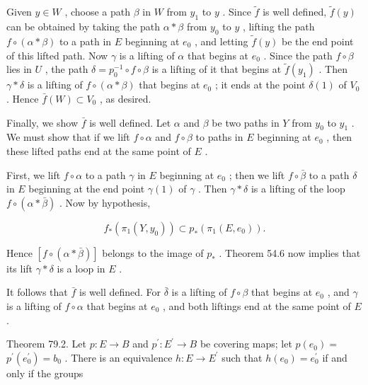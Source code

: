 Given \(y \in  W\) , choose a path \(\beta\) in \(W\) from \({y}_{1}\) to \(y\) . Since \(\widetilde{f}\) is well defined, \(\widetilde{f}\left( y\right)\) can be obtained by taking the path \(\alpha  * \beta\) from \({y}_{0}\) to \(y\) , lifting the path \(f \circ  \left( {\alpha  * \beta }\right)\) to a path in \(E\) beginning at \({e}_{0}\) , and letting \(\widetilde{f}\left( y\right)\) be the end point of this lifted path. Now \(\gamma\) is a lifting of \(\alpha\) that begins at \({e}_{0}\) . Since the path \(f \circ  \beta\) lies in \(U\) , the path \(\delta  = {p}_{0}^{-1} \circ  f \circ  \beta\) is a lifting of it that begins at \(\widetilde{f}\left( {y}_{1}\right)\) . Then \(\gamma  * \delta\) is a lifting of \(f \circ  \left( {\alpha  * \beta }\right)\) that begins at \({e}_{0}\) ; it ends at the point \(\delta \left( 1\right)\) of \({V}_{0}\) . Hence \(\bar{f}\left( W\right)  \subset  {V}_{0}\) , as desired.

Finally, we show \(\bar{f}\) is well defined. Let \(\alpha\) and \(\beta\) be two paths in \(Y\) from \({y}_{0}\) to \({y}_{1}\) . We must show that if we lift \(f \circ  \alpha\) and \(f \circ  \beta\) to paths in \(E\) beginning at \({e}_{0}\) , then these lifted paths end at the same point of \(E\) .

First, we lift \(f \circ  \alpha\) to a path \(\gamma\) in \(E\) beginning at \({e}_{0}\) ; then we lift \(f \circ  \bar{\beta }\) to a path \(\delta\) in \(E\) beginning at the end point \(\gamma \left( 1\right)\) of \(\gamma\) . Then \(\gamma  * \delta\) is a lifting of the loop \(f \circ  \left( {\alpha  * \bar{\beta }}\right)\) . Now by hypothesis,

\[
{f}_{ * }\left( {{\pi }_{1}\left( {Y,{y}_{0}}\right) }\right)  \subset  {p}_{ * }\left( {{\pi }_{1}\left( {E,{e}_{0}}\right) }\right) .
\]

Hence \(\left\lbrack  {f \circ  \left( {\alpha  * \bar{\beta }}\right) }\right\rbrack\) belongs to the image of \({p}_{ * }\) . Theorem 54.6 now implies that its lift \(\gamma  * \delta\) is a loop in \(E\) .

It follows that \(\bar{f}\) is well defined. For \(\bar{\delta }\) is a lifting of \(f \circ  \beta\) that begins at \({e}_{0}\) , and \(\gamma\) is a lifting of \(f \circ  \alpha\) that begins at \({e}_{0}\) , and both liftings end at the same point of \(E\) .

Theorem 79.2. Let \(p : E \rightarrow  B\) and \({p}^{\prime } : {E}^{\prime } \rightarrow  B\) be covering maps; let \(p\left( {e}_{0}\right)  =\)  \({p}^{\prime }\left( {e}_{0}^{\prime }\right)  = {b}_{0}\) . There is an equivalence \(h : E \rightarrow  {E}^{\prime }\) such that \(h\left( {e}_{0}\right)  = {e}_{0}^{\prime }\) if and only if the groups

